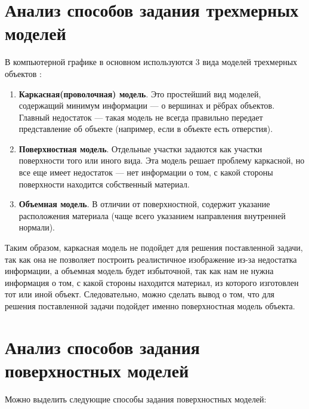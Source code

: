 \section{Анализ способов задания трехмерных моделей}

В компьютерной графике в основном используются 3 вида моделей трехмерных объектов \cite{models}:

\begin{enumerate}
	\item \textbf{Каркасная(проволочная) модель}. Это простейший вид моделей, содержащий минимум информации --- о вершинах и рёбрах объектов. Главный недостаток --- такая модель не всегда правильно передает представление об объекте (например, если в объекте есть отверстия).
	\item \textbf{Поверхностная модель}. Отдельные участки задаются как участки поверхности того или иного вида. Эта модель решает проблему каркасной, но все еще имеет недостаток --- нет информации о том, с какой стороны поверхности находится собственный материал.
	\item \textbf{Объемная модель}. В отличии от поверхностной, содержит указание расположения материала (чаще всего указанием направления внутренней нормали).
\end{enumerate}

Таким образом, каркасная модель не подойдет для решения поставленной задачи, так как она не позволяет построить реалистичное изображение из-за недостатка информации, а объемная модель будет избыточной, так как нам не нужна информация о том, с какой стороны находится материал, из которого изготовлен тот или иной объект. Следовательно, можно сделать вывод о том, что для решения поставленной задачи подойдет именно поверхностная модель объекта. 

\newpage

\section{Анализ способов задания поверхностных моделей}

Можно выделить следующие способы задания поверхностных моделей:

